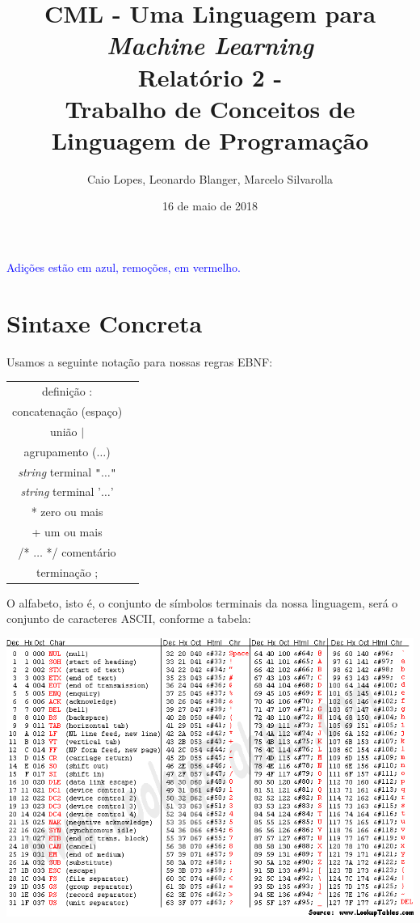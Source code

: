 \documentclass[12pt]{article}
\title{CML - Uma Linguagem para {\it Machine Learning} \\ \Large Relatório 2 - \blu{versão final} \\ Trabalho de Conceitos de Linguagem de Programação}
\author{Caio Lopes, Leonardo Blanger, Marcelo Silvarolla}
\date{16 de maio de 2018}
\newcommand{\blu}{\textcolor{blue}}
\begin{document}
\lstset{
  basicstyle=\ttfamily,
  columns=fullflexible,
  keepspaces=true,
  mathescape
}

\maketitle
\tableofcontents
\newpage

\blu{Adições estão em azul, remoções, em vermelho.}
\section{Sintaxe Concreta}
Usamos a seguinte notação para nossas regras EBNF:
\begin{center}
\begin{tabular}{c c}
definição  : \\
concatenação  (espaço) \\
união  $\vert$  \\
agrupamento  ($\ldots$) \\
{\it string} terminal  \verb!"!$\ldots$\verb!"! \\
{\it string} terminal  '$\ldots$' \\
*  zero ou mais \\
+  um ou mais \\
/* $\ldots$ */  comentário \\
terminação  ;
\end{tabular}
\end{center}

O alfabeto, isto é, o conjunto de símbolos terminais da nossa linguagem, será o conjunto de caracteres ASCII, conforme a tabela:
\begin{center}
\includegraphics[width=\linewidth,height=\textheight,keepaspectratio]{asciitable.png}
\end{center}
\end{document}
